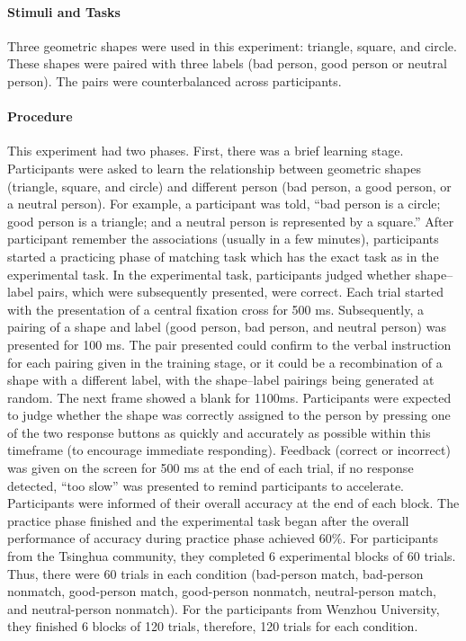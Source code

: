 \documentclass[
  english,
  man]{apa6}
\let\oldparagraph\paragraph
\renewcommand{\paragraph}[1]{\oldparagraph{#1}\mbox{}}
\begin{document}
\hypertarget{stimuli-and-tasks}{%
\paragraph{Stimuli and Tasks}\label{stimuli-and-tasks}}

Three geometric shapes were used in this experiment: triangle, square, and circle. These shapes were paired with three labels (bad person, good person or neutral person). The pairs were counterbalanced across participants.

\hypertarget{procedure}{%
\paragraph{Procedure}\label{procedure}}

This experiment had two phases. First, there was a brief learning stage. Participants were asked to learn the relationship between geometric shapes (triangle, square, and circle) and different person (bad person, a good person, or a neutral person). For example, a participant was told, \enquote{bad person is a circle; good person is a triangle; and a neutral person is represented by a square.} After participant remember the associations (usually in a few minutes), participants started a practicing phase of matching task which has the exact task as in the experimental task.
In the experimental task, participants judged whether shape--label pairs, which were subsequently presented, were correct. Each trial started with the presentation of a central fixation cross for 500 ms. Subsequently, a pairing of a shape and label (good person, bad person, and neutral person) was presented for 100 ms. The pair presented could confirm to the verbal instruction for each pairing given in the training stage, or it could be a recombination of a shape with a different label, with the shape--label pairings being generated at random. The next frame showed a blank for 1100ms. Participants were expected to judge whether the shape was correctly assigned to the person by pressing one of the two response buttons as quickly and accurately as possible within this timeframe (to encourage immediate responding). Feedback (correct or incorrect) was given on the screen for 500 ms at the end of each trial, if no response detected, \enquote{too slow} was presented to remind participants to accelerate. Participants were informed of their overall accuracy at the end of each block. The practice phase finished and the experimental task began after the overall performance of accuracy during practice phase achieved 60\%.
For participants from the Tsinghua community, they completed 6 experimental blocks of 60 trials. Thus, there were 60 trials in each condition (bad-person match, bad-person nonmatch, good-person match, good-person nonmatch, neutral-person match, and neutral-person nonmatch). For the participants from Wenzhou University, they finished 6 blocks of 120 trials, therefore, 120 trials for each condition.
\end{document}
